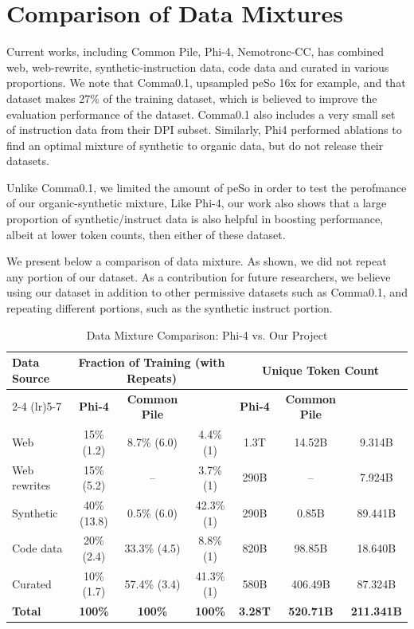 \section{Comparison of Data Mixtures}

Current works, including Common Pile, Phi-4, Nemotronc-CC, has combined web, web-rewrite, synthetic-instruction data, code data and curated in various proportions. We note that Comma0.1, upsampled peSo 16x for example, and that dataset makes 27\% of the training dataset, which is believed to improve the evaluation performance of the dataset. Comma0.1 also includes a very small set of instruction data from their DPI subset. Similarly, Phi4 performed ablations to find an optimal mixture of synthetic to organic data, but do not release their datasets. 

Unlike Comma0.1, we limited the amount of peSo in order to test the perofmance of our organic-synthetic mixture, Like Phi-4, our work also shows that a large proportion of synthetic/instruct data is also helpful in boosting performance, albeit at lower token counts, then either of these dataset.

We present below a comparison of data mixture. As shown, we did not repeat any portion of our dataset. As a contribution for future researchers, we believe using our dataset in addition to other permissive datasets such as Comma0.1, and repeating different portions, such as the synthetic instruct portion.

\begin{table}[h!]
\centering
\caption{Data Mixture Comparison: Phi-4 \citep{abdin2024phi4technicalreport} vs. Our Project}
\label{tab:my_table}
\begin{tabular}{lcccccc}
\toprule
\textbf{Data Source} & \multicolumn{3}{c}{\textbf{Fraction of Training (with Repeats)}} & \multicolumn{3}{c}{\textbf{Unique Token Count}} \\
\cmidrule(lr){2-4} \cmidrule(lr){5-7}
 & \textbf{Phi-4} & \textbf{Common Pile} & \textbf{\MixtureVitae{}} & \textbf{Phi-4} & \textbf{Common Pile} & \textbf{\MixtureVitae{}} \\
\midrule
Web & 15\% (1.2) & 8.7\% (6.0) & 4.4\% (1) & 1.3T & 14.52B & 9.314B \\
Web rewrites & 15\% (5.2) & -- & 3.7\% (1) & 290B & -- & 7.924B \\
Synthetic & 40\% (13.8) & 0.5\% (6.0) & 42.3\% (1) & 290B & 0.85B & 89.441B \\
Code data & 20\% (2.4) & 33.3\% (4.5) & 8.8\% (1) & 820B & 98.85B & 18.640B \\
Curated & 10\% (1.7) & 57.4\% (3.4) & 41.3\% (1) & 580B & 406.49B & 87.324B \\
\midrule
\textbf{Total} & \textbf{100\%} & \textbf{100\%} & \textbf{100\%} & \textbf{3.28T} & \textbf{520.71B} & \textbf{211.341B} \\
\bottomrule
\end{tabular}
\end{table}
